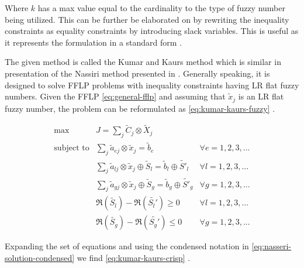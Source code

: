 \documentclass[ee,msthesis]{usuthesis}
\begin{document}
Where \(k\) has a max value equal to the cardinality to the type of fuzzy number being utilized. This can be further be
elaborated on by rewriting the inequality constraints as equality constraints by introducing slack variables. This is
useful as it represents the formulation in a standard form \cite{chen-2010-applied,vanderbei-2020-linear-progr}.

The given method is called the Kumar and Kaurs method \cite{kaur-2016-introd-fuzzy} which is similar in presentation of
the Nassiri method presented in \cite{bello-2019-fuzzy-activ}. Generally speaking, it is designed to solve FFLP
problems with inequality constraints having LR flat fuzzy numbers. Given the FFLP \ref{eq:general-fflp} and assuming that
\(\tilde{x}_j\) is an LR flat fuzzy number, the problem can be reformulated as \ref{eq:kumar-kaurs-fuzzy}
\cite{kaur-2016-introd-fuzzy}.

\begin{equation}
\label{eq:kumar-kaurs-fuzzy}
\begin{array}{lll}
\text{max}   & J = \sum_j \tilde{C}_j \otimes \tilde{X}_j              &                                              \\
\text{subject to} & \sum_j \tilde{a}_{ej} \otimes \tilde{x}_j               = \tilde{b}_e & \forall e = 1,2,3,...                \\
                  & \sum_j \tilde{a}_{lj} \otimes \tilde{x}_j \oplus \tilde{S}_l = \tilde{b}_l \oplus \tilde{S'}_l & \forall l = 1,2,3,... \\
                  & \sum_j \tilde{a}_{gj} \otimes \tilde{x}_j \oplus \tilde{S}_g = \tilde{b}_g \oplus \tilde{S'}_g & \forall g = 1,2,3,... \\
                  & \mathfrak{R}(\tilde{S_l}) - \mathfrak{R}(\tilde{S_l'}) \ge 0                                     & \forall l = 1,2,3,...      \\
                  & \mathfrak{R}(\tilde{S_g}) - \mathfrak{R}(\tilde{S_g'}) \le 0                                     & \forall g = 1,2,3,...
\end{array}
\end{equation}

Expanding the set of equations and using the condensed notation in \ref{eq:nasseri-solution-condensed} we find
\ref{eq:kumar-kaurs-crisp} \cite{kaur-2016-introd-fuzzy}.
\end{document}

